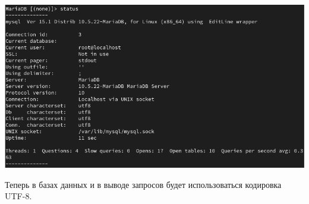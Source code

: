 \begin{enumerate}
\begin{center}
    \centering
    \includegraphics[width=\textwidth]{../images/image10.png}
    \label{10}
\end{center}
Теперь в базах данных и в выводе запросов будет использоваться кодировка UTF-8.
\end{enumerate}
